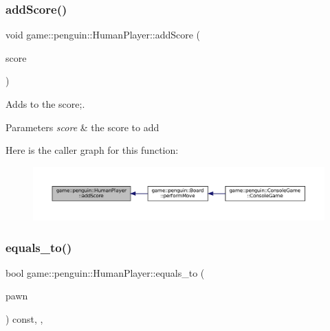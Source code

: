 \subsubsection{\texorpdfstring{add\+Score()}{addScore()}}
{\footnotesize\ttfamily void game\+::penguin\+::\+Human\+Player\+::add\+Score (\begin{DoxyParamCaption}\item[{int}]{score }\end{DoxyParamCaption})}



Adds to the score;. 


\begin{DoxyParams}{Parameters}
{\em score} & the score to add \\
\hline
\end{DoxyParams}
Here is the caller graph for this function\+:
\nopagebreak
\begin{figure}[H]
\begin{center}
\leavevmode
\includegraphics[width=350pt]{classgame_1_1penguin_1_1_human_player_a1474720bb1f767c195ac316dd6a8ee82_icgraph}
\end{center}
\end{figure}
\mbox{\label{classgame_1_1penguin_1_1_human_player_ad0f5548eee1fb7b866c592da4b529b69}} 
\subsubsection{\texorpdfstring{equals\+\_\+to()}{equals\_to()}}
{\footnotesize\ttfamily bool game\+::penguin\+::\+Human\+Player\+::equals\+\_\+to (\begin{DoxyParamCaption}\item[{const \hyperlink{classgame_1_1_abstract_player}{Abstract\+Player} \&}]{pawn }\end{DoxyParamCaption}) const\hspace{0.3cm}{\ttfamily [override]}, {\ttfamily [protected]}, {\ttfamily [virtual]}}



